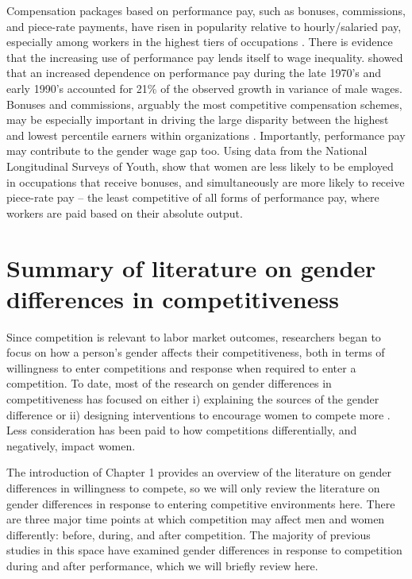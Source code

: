 \documentclass[a4paper, nobind]{templates/ociamthesis}
\begin{document}
Compensation packages based on performance pay, such as bonuses, commissions, and piece-rate payments, have risen in popularity relative to hourly/salaried pay, especially among workers in the highest tiers of occupations \autocite{Hall1998,Murphy1999,Cunat2005,Lemiuex2009}. There is evidence that the increasing use of performance pay lends itself to wage inequality. \textcite{Lemiuex2009} showed that an increased dependence on performance pay during the late 1970's and early 1990's accounted for 21\% of the observed growth in variance of male wages. Bonuses and commissions, arguably the most competitive compensation schemes, may be especially important in driving the large disparity between the highest and lowest percentile earners within organizations \autocite{Bell2010,Bell2014,Benabou2016}. Importantly, performance pay may contribute to the gender wage gap too. Using data from the National Longitudinal Surveys of Youth, \textcite{McGee2015} show that women are less likely to be employed in occupations that receive bonuses, and simultaneously are more likely to receive piece-rate pay -- the least competitive of all forms of performance pay, where workers are paid based on their absolute output.

\hypertarget{summary-of-literature-on-gender-differences-in-competitiveness}{%
\section{Summary of literature on gender differences in competitiveness}\label{summary-of-literature-on-gender-differences-in-competitiveness}}

Since competition is relevant to labor market outcomes, researchers began to focus on how a person's gender affects their competitiveness, both in terms of willingness to enter competitions and response when required to enter a competition. To date, most of the research on gender differences in competitiveness has focused on either i) explaining the sources of the gender difference \autocite[e.g.,][]{Veldhuizen2017} or ii) designing interventions to encourage women to compete more \autocite{Balafoutas2012,Sutter2016,Cassar2016,Brandts2015,Niederle2013,Brandts2015,Healy2011,Alan2018}. Less consideration has been paid to how competitions differentially, and negatively, impact women.

The introduction of Chapter 1 provides an overview of the literature on gender differences in willingness to compete, so we will only review the literature on gender differences in response to entering competitive environments here. There are three major time points at which competition may affect men and women differently: before, during, and after competition. The majority of previous studies in this space have examined gender differences in response to competition during and after performance, which we will briefly review here.
\end{document}
